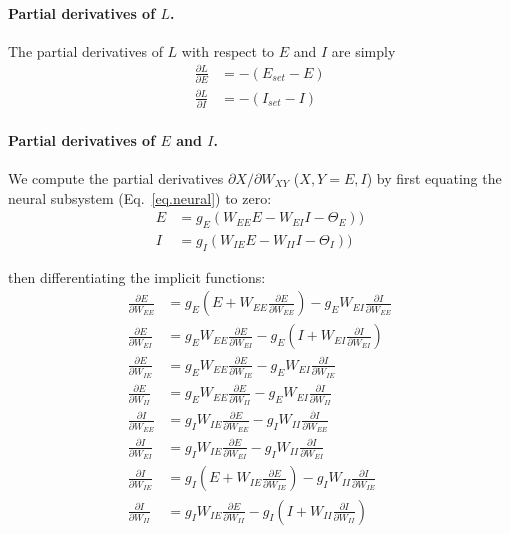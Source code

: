 \documentclass[twocolumn]{article}
\newcommand{\EE}{\mathit{EE}}
\newcommand{\EI}{\mathit{EI}}
\newcommand{\IE}{\mathit{IE}}
\newcommand{\II}{\mathit{II}}
\newcommand{\XY}{\mathit{XY}}
\newcommand{\set}{\mathit{set}}
\begin{document}
\paragraph{Partial derivatives of $L$.}

The partial derivatives of $L$ with respect to $E$ and $I$ are simply
\begin{equation}
\begin{aligned}
\frac{\partial L}{\partial E} & = - (E_{\set} - E) \\
\frac{\partial L}{\partial I} & = - (I_{\set} - I)
\end{aligned}
\label{eq.LF_dLdEI}
\end{equation}



\paragraph{Partial derivatives of $E$ and $I$.}

We compute the partial derivatives $\partial X/\partial W_{\XY}$ ($X,Y = E,I$) by first equating the neural subsystem (Eq.\ \ref{eq.neural}) to zero:
\begin{equation}
\begin{aligned}
E & = g_E(W_{\EE}E - W_{\EI}I - \Theta_E)) \\
I & = g_I(W_{\IE}E - W_{\II}I - \Theta_I))
\end{aligned}
\label{eq.LF_implicit_functions}
\end{equation}

\noindent then differentiating the implicit functions:
\begin{equation}
\begin{aligned}
\frac{\partial E}{\partial W_{\EE}} & = g_E(E + W_{\EE} \frac{\partial E}{\partial W_{\EE}}) - g_E W_{\EI} \frac{\partial I}{\partial W_{\EE}} \\
\frac{\partial E}{\partial W_{\EI}} & = g_E W_{\EE} \frac{\partial E}{\partial W_{\EI}} - g_E (I + W_{\EI} \frac{\partial I}{\partial W_{\EI}}) \\
\frac{\partial E}{\partial W_{\IE}} & = g_E W_{\EE} \frac{\partial E}{\partial W_{\IE}} - g_E W_{\EI}\frac{\partial I}{\partial W_{\IE}} \\
\frac{\partial E}{\partial W_{\II}} & = g_E W_{\EE} \frac{\partial E}{\partial W_{\II}} - g_E W_{\EI} \frac{\partial I}{\partial W_{\II}} \\
\frac{\partial I}{\partial W_{\EE}} & = g_I W_{\IE} \frac{\partial E}{\partial W_{\EE}} - g_I W_{\II} \frac{\partial I}{\partial W_{\EE}} \\
\frac{\partial I}{\partial W_{\EI}} & = g_I W_{\IE} \frac{\partial E}{\partial W_{\EI}} - g_I W_{\II} \frac{\partial I}{\partial W_{\EI}} \\
\frac{\partial I}{\partial W_{\IE}} & = g_I (E + W_{\IE} \frac{\partial E}{\partial W_{\IE}}) - g_I W_{\II} \frac{\partial I}{\partial W_{\IE}} \\
\frac{\partial I}{\partial W_{\II}} & = g_I W_{\IE} \frac{\partial E}{\partial W_{\II}} - g_I (I + W_{\II} \frac{\partial I}{\partial W_{\II}})
\end{aligned}
\label{eq.LF_implicit_derivs}
\end{equation}
\end{document}
